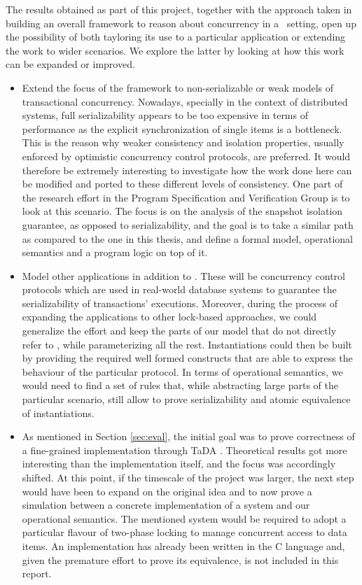 The results obtained as part of this project, together with the approach taken in building an overall framework to reason about concurrency in a \tpl\ setting, open up the possibility of both tayloring its use to a particular application or extending the work to wider scenarios. We explore the latter by looking at how this work can be expanded or improved.
\begin{itemize}
	\item Extend the focus of the framework to non-serializable or weak models of transactional concurrency. Nowadays, specially in the context of distributed systems, full serializability appears to be too expensive in terms of performance as the explicit synchronization of single items is a bottleneck. This is the reason why weaker consistency and isolation properties, usually enforced by optimistic concurrency control protocols, are preferred. It would therefore be extremely interesting to investigate how the work done here can be modified and ported to these different levels of consistency. One part of the research effort in the Program Specification and Verification Group is to look at this scenario. The focus is on the analysis of the snapshot isolation guarantee, as opposed to serializability, and the goal is to take a similar path as compared to the one in this thesis, and define a formal model, operational semantics and a program logic on top of it.
	
	\item Model other applications in addition to \tpl. These will be concurrency control protocols which are used in real-world database systems to guarantee the serializability of transactions' executions. Moreover, during the process of expanding the applications to other lock-based approaches, we could generalize the effort and keep the parts of our model that do not directly refer to \tpl, while parameterizing all the rest. Instantiations could then be built by providing the required well formed constructs that are able to express the behaviour of the particular protocol. In terms of operational semantics, we would need to find a set of rules that, while abstracting large parts of the particular scenario, still allow to prove serializability and atomic equivalence of instantiations.
	
	\item As mentioned in Section \ref{sec:eval}, the initial goal was to prove correctness of a fine-grained implementation through TaDA \cite{tada}. Theoretical results got more interesting than the implementation itself, and the focus was accordingly shifted. At this point, if the timescale of the project was larger, the next step would have been to expand on the original idea and to now prove a simulation between a concrete implementation of a system and our operational semantics. The mentioned system would be required to adopt a particular flavour of two-phase locking to manage concurrent access to data items. An implementation has already been written in the C language and, given the premature effort to prove its equivalence, is not included in this report.
	

\end{itemize}
